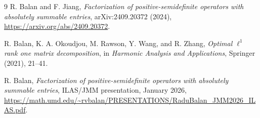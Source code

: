 \documentclass[11pt]{article}
\begin{document}
\begin{thebibliography}{9}
R. Balan and F. Jiang,
\emph{Factorization of positive-semidefinite operators with absolutely
summable entries}, arXiv:2409.20372 (2024),
\url{https://arxiv.org/abs/2409.20372}.

R. Balan, K. A. Okoudjou, M. Rawson, Y. Wang, and R. Zhang,
\emph{Optimal $\ell^1$ rank one matrix decomposition},
in \emph{Harmonic Analysis and Applications}, Springer (2021), 21--41.

R. Balan,
\emph{Factorization of positive-semidefinite operators with absolutely
summable entries}, ILAS/JMM presentation, January 2026,
\url{https://math.umd.edu/~rvbalan/PRESENTATIONS/RaduBalan_JMM2026_ILAS.pdf}.
\end{thebibliography}
\end{document}
